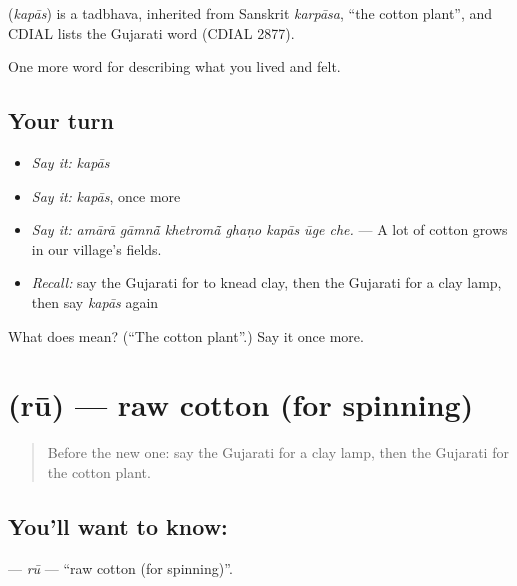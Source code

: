 \begin{cousinweb}
\textbf{} (\emph{kapās}) is a tadbhava, inherited from Sanskrit \emph{karpāsa}, \textquotedblleft{}the cotton plant\textquotedblright{}, and CDIAL lists the Gujarati word (CDIAL 2877).
\end{cousinweb}

\begin{grammarlens}[title={What you've built}]
One more word for describing what you lived and felt.
\end{grammarlens}

\subsection*{Your turn}
\begin{itemize}
\raggedright
  \item \emph{Say it:} \emph{kapās}
  \item \emph{Say it:} \emph{kapās}, once more
  \item \emph{Say it:} \emph{amārā gāmnā̃ khetromā̃ ghaṇo kapās ūge che.} — A lot of cotton grows in our village's fields.
  \item \emph{Recall:} say the Gujarati for to knead clay, then the Gujarati for a clay lamp, then say \emph{kapās} again
\end{itemize}

\begin{tcolorbox}[breakable,colback=teal!4,colframe=teal!35!black,title={Before you move on}]
What does  mean? (\textquotedblleft{}The cotton plant\textquotedblright{}.) Say it once more.
\end{tcolorbox}
\section[\texorpdfstring{\gu{રૂ} (rū)}{રૂ (rū)}]{ (rū) — raw cotton (for spinning)}

\label{lesson:GU-C505-ru}



\begin{quote}
Before the new one: say the Gujarati for a clay lamp, then the Gujarati for the cotton plant.
\end{quote}

\subsection*{You'll want to know: }
\textbf{} — \emph{rū} — \textquotedblleft{}raw cotton (for spinning)\textquotedblright{}.

